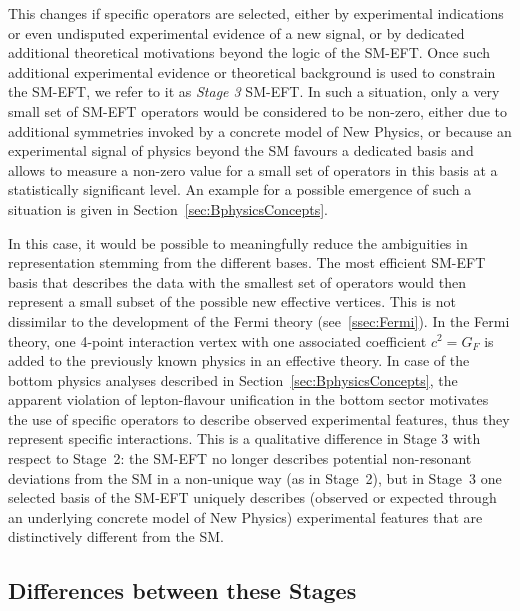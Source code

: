 This changes if specific operators are selected, either by
experimental indications or even undisputed experimental evidence of a
new signal, or by dedicated additional theoretical motivations beyond
the logic of the SM-EFT. Once such additional experimental evidence or
theoretical background is used to constrain the SM-EFT, we refer to it
as \emph{Stage 3} SM-EFT.  In such a situation, only a very small set
of SM-EFT operators would be considered to be non-zero, either due to
additional symmetries invoked by a concrete model of New Physics, or
because an experimental signal of physics beyond the SM favours a
dedicated basis and allows to measure a non-zero value for a small set
of operators in this basis at a statistically
significant level. An example for a possible emergence of such a
situation is given in Section~\ref{sec:BphysicsConcepts}.

In this case, it would be possible to meaningfully reduce the
ambiguities in representation stemming from the different bases. The
most efficient SM-EFT basis that describes the data with the
smallest set of operators would then represent a small subset of the
possible new effective vertices.  This is not dissimilar to the
development of the Fermi theory (see~\ref{ssec:Fermi}). In the Fermi
theory, one 4-point interaction vertex with one associated coefficient
$c^2=G_F$ is added to the previously known physics in an effective
theory. In case of the bottom physics analyses described in Section~\ref{sec:BphysicsConcepts}, the apparent
violation of lepton-flavour unification in the bottom sector motivates
the use of specific operators to describe observed experimental
features, thus they represent specific interactions. This is a
qualitative difference in Stage 3 with respect to Stage~2: the SM-EFT
no longer describes potential non-resonant deviations from the
SM in a non-unique way (as in Stage~2), but in Stage~3 one selected basis of
the SM-EFT uniquely describes (observed or expected through an
underlying concrete model of New Physics) experimental features that
are distinctively different from the SM.

\subsection{Differences between these Stages}


